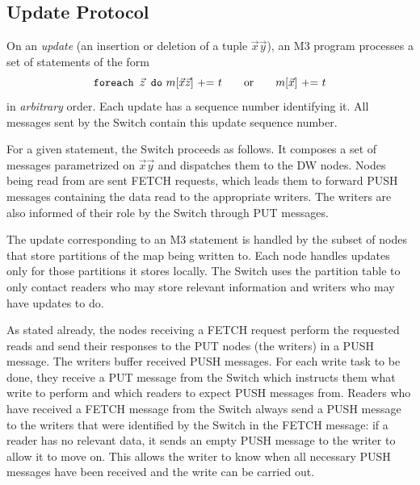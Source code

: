 \subsection{Update Protocol}




On an {\em update} (an insertion or deletion of a tuple
$\vec{x}\vec{y}$), an M3 program processes a set of statements of the form
\[
\mbox{{\tt foreach $\vec{z}$ do} $m[\vec{x}\vec{z}]$ += $t$
~~~~~or~~~~~ $m[\vec{x}]$ += $t$}
\]
in {\em arbitrary}\/ order.
%
Each update has a sequence number identifying it. All messages sent by the
Switch contain this update sequence number.

For a given statement, the Switch proceeds as follows.
It composes a set of messages parametrized on $\vec{x}\vec{y}$ and
dispatches them to the DW nodes.
Nodes being read from are sent FETCH requests, which leads them to forward
PUSH messages containing the data read
to the appropriate writers. The writers are also
informed of their role by the Switch through PUT messages.

The update corresponding to an M3 statement is handled by the subset of
nodes that store partitions of the map being written to.  Each node
handles updates only for those partitions it stores locally. The Switch
uses the partition table to only contact readers who may store relevant information and writers who may have updates to do. 


As stated already, the nodes receiving a FETCH request perform the
requested reads and send their responses to the PUT nodes (the writers)
in a PUSH message.
The writers buffer received PUSH messages. For each write task to be
done, they receive a PUT message from the Switch which instructs them
what write to perform and which readers to expect PUSH messages from.
Readers who have received a FETCH message from the Switch always
send a PUSH message to the writers that were
identified by the Switch in the FETCH
message: if a reader has no relevant data, it sends an empty PUSH message to
the writer to allow it to move on.
This allows the writer to know when all necessary PUSH messages have been
received and the write can be carried out.

